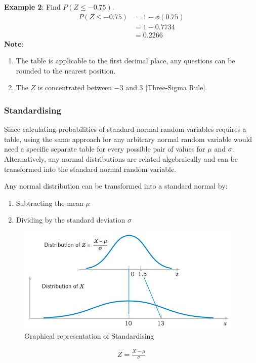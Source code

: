 \documentclass[10pt,a4paper]{article}
\begin{document}
\textbf{Example 2}: Find $P(Z \leq -0.75)$.
\begin{align*}
    P(Z \leq -0.75) &= 1 - \phi(0.75) \\
    &= 1 - 0.7734 \\
    &= 0.2266
\end{align*}
\textbf{Note}:
\begin{enumerate}
    \item The table is applicable to the first decimal place, any questions can be rounded to the nearest
    position.
    \item The $Z$ is concentrated between $-3$ and $3$ [Three-Sigma Rule].
\end{enumerate}

\subsubsection{Standardising}

Since calculating probabilities of standard normal random variables requires a table, using the same
approach for any arbitrary normal random variable would need a specific separate table for every possible
pair of values for $\mu$ and $\sigma$. Alternatively, any normal distributions are related
algebraically and can be transformed into the standard normal random variable.

Any normal distribution can be transformed into a standard normal by:
\begin{enumerate}
    \item Subtracting the mean $\mu$ 
    \item Dividing by the standard deviation $\sigma$
\end{enumerate}
\begin{figure} [h!]
    \centering
    \includegraphics[scale=0.9]{Standard.JPG}
    \caption{Graphical representation of Standardising}
\end{figure}
\begin{align*}
    Z = \frac{X - \mu}{\sigma}
\end{align*}
\end{document}
